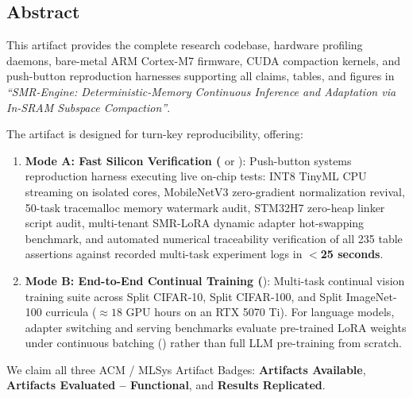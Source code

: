 \documentclass{article}
\begin{document}
\subsection{Abstract}
This artifact provides the complete research codebase, hardware profiling daemons, bare-metal ARM Cortex-M7 firmware, CUDA compaction kernels, and push-button reproduction harnesses supporting all claims, tables, and figures in \emph{``SMR-Engine: Deterministic-Memory Continuous Inference and Adaptation via In-SRAM Subspace Compaction''}. 

The artifact is designed for turn-key reproducibility, offering:
\begin{enumerate}\small\setlength{\itemsep}{1pt}\setlength{\parskip}{0pt}
    \item \textbf{Mode A: Fast Silicon Verification (} or ): Push-button systems reproduction harness executing live on-chip tests: INT8 TinyML CPU streaming on isolated cores, MobileNetV3 zero-gradient normalization revival, 50-task tracemalloc memory watermark audit, STM32H7 zero-heap linker script audit, multi-tenant SMR-LoRA dynamic adapter hot-swapping benchmark, and automated numerical traceability verification of all 235 table assertions against recorded multi-task experiment logs in \textbf{$<$25 seconds}.
    \item \textbf{Mode B: End-to-End Continual Training (}): Multi-task continual vision training suite across Split CIFAR-10, Split CIFAR-100, and Split ImageNet-100 curricula ($\approx 18$ GPU hours on an RTX 5070 Ti). For language models, adapter switching and serving benchmarks evaluate pre-trained LoRA weights under continuous batching () rather than full LLM pre-training from scratch.
\end{enumerate}
We claim all three ACM / MLSys Artifact Badges: \textbf{Artifacts Available}, \textbf{Artifacts Evaluated -- Functional}, and \textbf{Results Replicated}.
\end{document}

